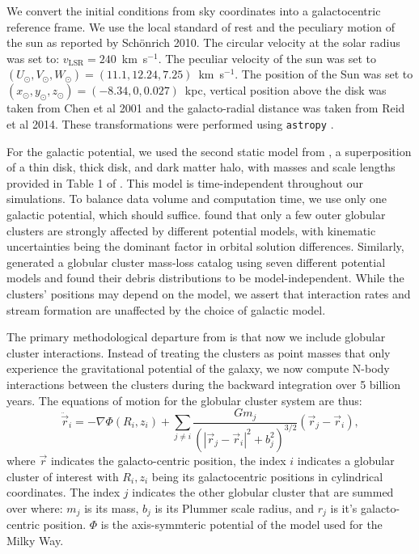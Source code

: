 \documentclass{aa}
\begin{document}
    We convert the initial conditions from sky coordinates into a galactocentric reference frame. We use the local standard of rest and the peculiary motion of the sun as reported by Sch\"onrich 2010. The circular velocity at the solar radius was set to: $v_{\text{LSR}} = 240$~km~s$^{-1}$. The peculiar velocity of the sun was set to $(U_\odot, V_\odot, W_\odot)=(11.1, 12.24, 7.25)$~km~s$^{-1}$. The position of the Sun was set to $(x_\odot,y_\odot,z_\odot) = (-8.34,0,0.027)$~kpc, vertical position above the disk was taken from Chen et al 2001 and the galacto-radial distance was taken from Reid et al 2014. These transformations were performed using \texttt{astropy} \citep{2013A&A...558A..33A}.


    For the galactic potential, we used the second static model from \citet{2017A&A...598A..66P}, a superposition of a thin disk, thick disk, and dark matter halo, with masses and scale lengths provided in Table 1 of \citet{2023A&A...673A..44F}. This model is time-independent throughout our simulations. To balance data volume and computation time, we use only one galactic potential, which should suffice. \citet{2021MNRAS.505.5978V} found that only a few outer globular clusters are strongly affected by different potential models, with kinematic uncertainties being the dominant factor in orbital solution differences. Similarly, \citet{2024MNRAS.528.5189G} generated a globular cluster mass-loss catalog using seven different potential models and found their debris distributions to be model-independent. While the clusters' positions may depend on the model, we assert that interaction rates and stream formation are unaffected by the choice of galactic model.    

    The primary methodological departure from \citet{2023A&A...673A..44F} is that now we include globular cluster interactions. Instead of treating the clusters as point masses that only experience the gravitational potential of the galaxy, we now compute N-body interactions between the clusters during the backward integration over 5 billion years. The equations of motion for the globular cluster system are thus: 
    \begin{equation}
      \ddot{\vec{r}}_i = -\nabla \Phi(R_i,z_i) + \left.\sum_{j\neq i} \frac{Gm_j}{\left(|\vec{r}_j - \vec{r}_i|^2 + b_j^2\right)^{3/2}}\right. \left(\vec{r}_j - \vec{r}_i\right),
    \end{equation}\label{eq:GCNBody} where $\vec{r}$ indicates the galacto-centric position, the index $i$ indicates a globular cluster of interest with $R_i,z_i$ being its galactocentric positions in cylindrical coordinates. The index $j$ indicates the other globular cluster that are summed over where: $m_j$ is its mass, $b_j$ is its Plummer scale radius, and $r_j$ is it's galacto-centric position. $\Phi$ is the axis-symmteric potential of the model used for the Milky Way. 
\end{document}
